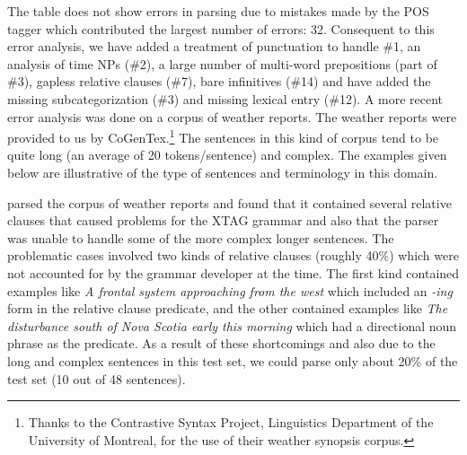 The table does not show errors in parsing due to mistakes made by the POS
tagger which contributed the largest number of errors: 32. Consequent to
this error analysis, we have added a treatment of punctuation to handle
\#1, an analysis of time NPs (\#2), a large number of multi-word
prepositions (part of \#3), gapless relative clauses (\#7), bare
infinitives (\#14) and have added the missing subcategorization (\#3) and
missing lexical entry (\#12).  A more recent error analysis was done on a
corpus of weather reports. The weather reports were provided to us by
CoGenTex.\footnote{%
%
Thanks to the Contrastive Syntax Project, Linguistics Department of the
University of Montreal, for the use of their weather synopsis corpus.%
%
} The sentences in this kind of corpus tend to be quite long (an average of
20 tokens/sentence) and complex. The examples given below are illustrative
of the type of sentences and terminology in this domain.


\cite{c.97:_maint_xtag} parsed the corpus of weather reports and found that
it contained several relative clauses that caused problems for the XTAG
grammar and also that the parser was unable to handle some of the more
complex longer sentences. The problematic cases involved two kinds of
relative clauses (roughly 40\%) which were not accounted for by the grammar
developer at the time. The first kind contained examples like {\em A
frontal system approaching from the west} which included an {\em -ing} form
in the relative clause predicate, and the other contained examples like
{\it The disturbance south of Nova Scotia early this morning} which had a
directional noun phrase as the predicate. As a result of these shortcomings
and also due to the long and complex sentences in this test set, we could
parse only about 20\% of the test set (10 out of 48 sentences). 

